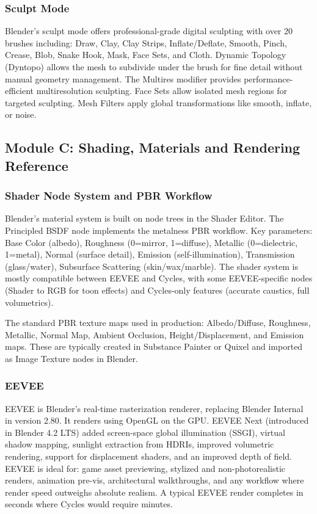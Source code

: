\documentclass[11pt,letterpaper]{article}
\begin{document}
\subsubsection{Sculpt Mode}

Blender's sculpt mode offers professional-grade digital sculpting with over 20 brushes including: Draw, Clay, Clay Strips, Inflate/Deflate, Smooth, Pinch, Crease, Blob, Snake Hook, Mask, Face Sets, and Cloth. Dynamic Topology (Dyntopo) allows the mesh to subdivide under the brush for fine detail without manual geometry management. The Multires modifier provides performance-efficient multiresolution sculpting. Face Sets allow isolated mesh regions for targeted sculpting. Mesh Filters apply global transformations like smooth, inflate, or noise.

\subsection{Module C: Shading, Materials and Rendering Reference}

\subsubsection{Shader Node System and PBR Workflow}

Blender's material system is built on node trees in the Shader Editor. The Principled BSDF node implements the metalness PBR workflow. Key parameters: Base Color (albedo), Roughness (0=mirror, 1=diffuse), Metallic (0=dielectric, 1=metal), Normal (surface detail), Emission (self-illumination), Transmission (glass/water), Subsurface Scattering (skin/wax/marble). The shader system is mostly compatible between EEVEE and Cycles, with some EEVEE-specific nodes (Shader to RGB for toon effects) and Cycles-only features (accurate caustics, full volumetrics).

The standard PBR texture maps used in production: Albedo/Diffuse, Roughness, Metallic, Normal Map, Ambient Occlusion, Height/Displacement, and Emission maps. These are typically created in Substance Painter or Quixel and imported as Image Texture nodes in Blender.

\subsubsection{EEVEE}

EEVEE is Blender's real-time rasterization renderer, replacing Blender Internal in version 2.80. It renders using OpenGL on the GPU. EEVEE Next (introduced in Blender 4.2 LTS) added screen-space global illumination (SSGI), virtual shadow mapping, sunlight extraction from HDRIs, improved volumetric rendering, support for displacement shaders, and an improved depth of field. EEVEE is ideal for: game asset previewing, stylized and non-photorealistic renders, animation pre-vis, architectural walkthroughs, and any workflow where render speed outweighs absolute realism. A typical EEVEE render completes in seconds where Cycles would require minutes.
\end{document}
